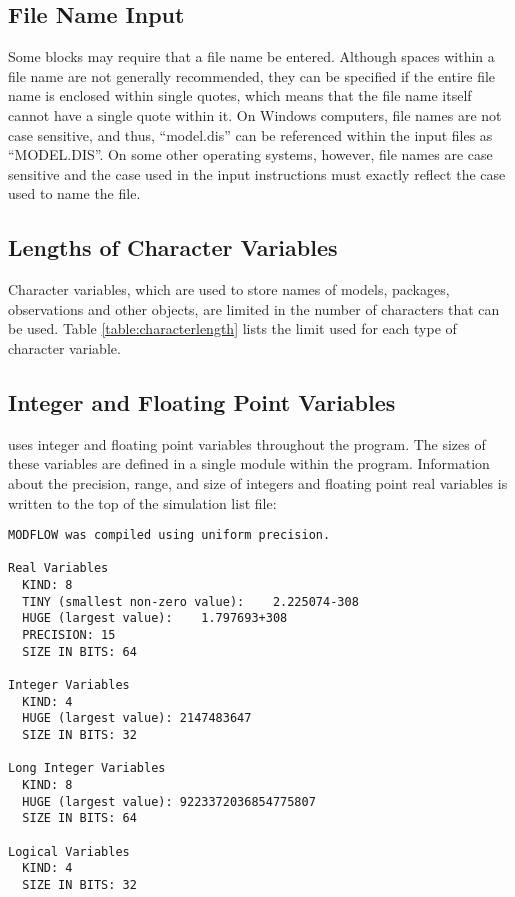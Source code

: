 \subsection{File Name Input}
Some blocks may require that a file name be entered.  Although spaces within a file name are not generally recommended, they can be specified if the entire file name is enclosed within single quotes, which means that the file name itself cannot have a single quote within it.  On Windows computers, file names are not case sensitive, and thus, ``model.dis'' can be referenced within the input files as ``MODEL.DIS''.  On some other operating systems, however, file names are case sensitive and the case used in the input instructions must exactly reflect the case used to name the file.

\subsection{Lengths of Character Variables}
Character variables, which are used to store names of models, packages, observations and other objects, are limited in the number of characters that can be used. Table \ref{table:characterlength} lists the limit used for each type of character variable.

\FloatBarrier

\FloatBarrier

\subsection{Integer and Floating Point Variables}
\mf uses integer and floating point variables throughout the program.  The sizes of these variables are defined in a single module within the program.  Information about the precision, range, and size of integers and floating point real variables is written to the top of the simulation list file: 

{\small
\begin{lstlisting}[style=modeloutput]
MODFLOW was compiled using uniform precision.

Real Variables
  KIND: 8
  TINY (smallest non-zero value):    2.225074-308
  HUGE (largest value):    1.797693+308
  PRECISION: 15
  SIZE IN BITS: 64

Integer Variables
  KIND: 4
  HUGE (largest value): 2147483647
  SIZE IN BITS: 32

Long Integer Variables
  KIND: 8
  HUGE (largest value): 9223372036854775807
  SIZE IN BITS: 64

Logical Variables
  KIND: 4
  SIZE IN BITS: 32
\end{lstlisting}
}

